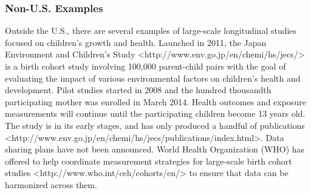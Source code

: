 \documentclass[letterpaper,man,apacite]{apa6}
\begin{document}
\subsubsection{Non-U.S. Examples}

Outside the U.S., there are several examples of large-scale longitudinal studies focused on children's growth and health.
Launched in 2011, the Japan Environment and Children's Study <http://www.env.go.jp/en/chemi/hs/jecs/> is a birth cohort study involving 100,000 parent-child pairs with the goal of evaluating the impact of various environmental factors on children's health and development. 
Pilot studies started in 2008 and the hundred thousandth participating mother was enrolled in March 2014. 
Health outcomes and exposure measurements will continue until the participating children become 13 years old.
The study is in its early stages, and has only produced a handful of publications <http://www.env.go.jp/en/chemi/hs/jecs/publications/index.html>.
Data sharing plans have not been announced.
World Health Organization (WHO) has offered to help coordinate measurement strategies for large-scale birth cohort studies <http://www.who.int/ceh/cohorts/en/> to ensure that data can be harmonized across them.
\end{document}
